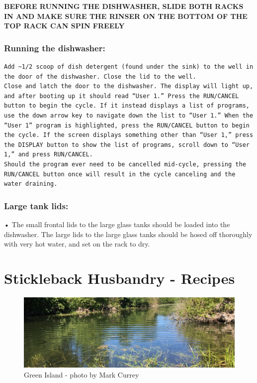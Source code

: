 \documentclass[
]{book}
\begin{document}
\textbf{BEFORE RUNNING THE DISHWASHER, SLIDE BOTH RACKS IN AND MAKE SURE THE RINSER ON THE BOTTOM OF THE TOP RACK CAN SPIN FREELY}

\hypertarget{running-the-dishwasher}{%
\subsection{Running the dishwasher:}\label{running-the-dishwasher}}

\begin{verbatim}
Add ~1/2 scoop of dish detergent (found under the sink) to the well in the door of the dishwasher. Close the lid to the well.
Close and latch the door to the dishwasher. The display will light up, and after booting up it should read “User 1.” Press the RUN/CANCEL button to begin the cycle. If it instead displays a list of programs, use the down arrow key to navigate down the list to “User 1.” When the “User 1” program is highlighted, press the RUN/CANCEL button to begin the cycle. If the screen displays something other than “User 1,” press the DISPLAY button to show the list of programs, scroll down to “User 1,” and press RUN/CANCEL.  
Should the program ever need to be cancelled mid-cycle, pressing the RUN/CANCEL button once will result in the cycle canceling and the water draining. 
\end{verbatim}

\hypertarget{large-tank-lids}{%
\subsection{Large tank lids:}\label{large-tank-lids}}

• The small frontal lids to the large glass tanks should be loaded into the dishwasher. The large lids to the large glass tanks should be hosed off thoroughly with very hot water, and set on the rack to dry.

\hypertarget{stickleback-husbandry---recipes}{%
\chapter{Stickleback Husbandry - Recipes}\label{stickleback-husbandry---recipes}}

\begin{figure}
\centering
\includegraphics{images/green_island_header.jpg}
\caption{Green Island - photo by Mark Currey}
\end{figure}
\end{document}
